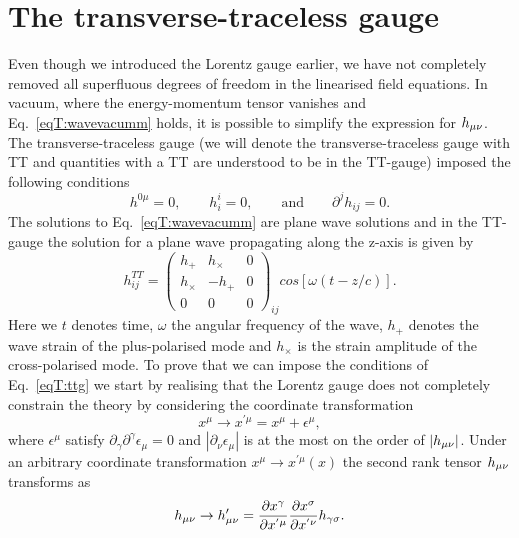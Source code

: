 \section{The transverse-traceless gauge}
Even though we introduced the Lorentz gauge earlier, we have not completely removed all superfluous degrees of freedom 
in the linearised field equations. In vacuum, where the energy-momentum tensor vanishes and Eq.~\ref{eqT:wavevacumm} holds, it is possible
to simplify the expression for $h_{\mu\nu}$. The transverse-traceless gauge (we will denote the transverse-traceless gauge
with TT and quantities with a TT are understood to be in the TT-gauge) imposed the following conditions
\begin{equation} \label{eqT:ttg}
h^{0 \mu} = 0, \qquad h^{i}_{i} = 0, \qquad \text{and} \qquad \partial^j h_{ij} = 0.
\end{equation}
The solutions to Eq.~\ref{eqT:wavevacumm} are plane wave solutions and in the TT-gauge the 
solution for a plane wave propagating along the z-axis is given by
\begin{equation} \label{eqT:hzdir}
h_{ij}^{TT}=
  \begin{pmatrix}
    h_{+} & h_{\times} & 0  \\
    h_{\times} & -h_{+} & 0 \\
    0 & 0 & 0
  \end{pmatrix}_{ij}
  cos[\omega(t - z/c)].
\end{equation}
Here we $t$ denotes time, $\omega$ the angular frequency of the wave,
$h_+$ denotes the wave strain of the plus-polarised mode and $h_{\times}$ is the strain amplitude of the cross-polarised mode.
To prove that we can impose the conditions of Eq.~\ref{eqT:ttg} we start by
realising that the Lorentz gauge does not completely constrain the theory by considering the 
coordinate transformation 
\begin{equation} \label{eqT:ct}
x^{\mu} \rightarrow x^{'\mu} = x^{\mu} + \epsilon^{\mu},
\end{equation}
where $\epsilon^{\mu}$ satisfy $\partial_{\gamma} \partial^{\gamma} \epsilon_{\mu} = 0$ 
and $|\partial_{\nu} \epsilon_{\mu}|$ is at the most on the order of $|h_{\mu\nu}|$.
Under an arbitrary coordinate transformation $x^{\mu} \rightarrow x^{'\mu}(x)$ the second rank tensor $h_{\mu\nu}$ transforms as
\begin{equation} \label{eqT:t2c}
h_{\mu\nu} \rightarrow h'_{\mu\nu} = \frac{\partial x^{\gamma}}{\partial x^{'\mu}} \frac{\partial x^{\sigma}}{\partial x^{'\nu}} h_{\gamma \sigma}.
\end{equation}
